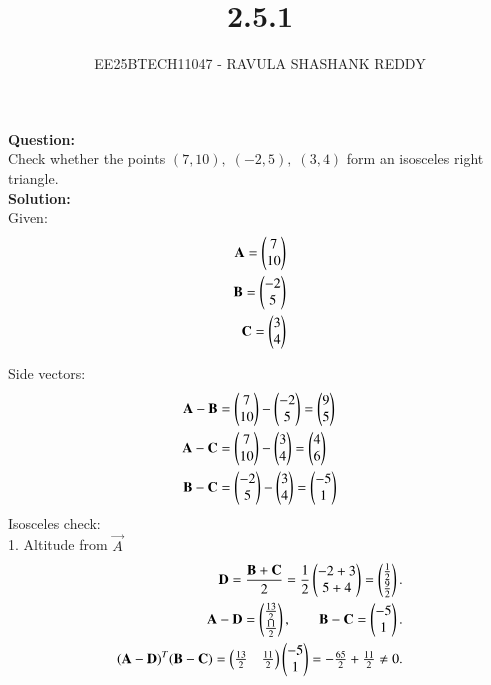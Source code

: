 \documentclass[journal]{article}
\begin{document}
	
	
	\vspace{3cm}
	
\title{2.5.1}
\author{EE25BTECH11047 - RAVULA SHASHANK REDDY}
\maketitle
\hrulefill
\bigskip 

\renewcommand{\thetable}{\theenumi}
\setlength{\intextsep}{10pt}
\textbf{Question:} \\

Check whether the points \( (7,10),\; (-2,5),\; (3,4) \) form an isosceles right triangle.\\

\textbf{Solution:}\\

Given:
\begin{align}
\mathbf{A} = \begin{pmatrix}7 \\ 10\end{pmatrix} \\
\mathbf{B} = \begin{pmatrix}-2 \\ 5\end{pmatrix} \\
\mathbf{C} = \begin{pmatrix}3 \\ 4\end{pmatrix}
\end{align}

Side vectors:
\begin{align}
\mathbf{A}-\mathbf{B} &= \begin{pmatrix}7 \\ 10\end{pmatrix} - \begin{pmatrix}-2 \\ 5\end{pmatrix} = \begin{pmatrix}9 \\ 5\end{pmatrix} \\
\mathbf{A}-\mathbf{C} &= \begin{pmatrix}7 \\ 10\end{pmatrix} - \begin{pmatrix}3 \\ 4\end{pmatrix} = \begin{pmatrix}4 \\ 6\end{pmatrix} \\
\mathbf{B}-\mathbf{C} &= \begin{pmatrix}-2 \\ 5\end{pmatrix} - \begin{pmatrix}3 \\ 4\end{pmatrix} = \begin{pmatrix}-5 \\ 1\end{pmatrix}
\end{align}
\newpage
Isosceles check:\\

1. Altitude from $\vec{A}$ 
\begin{align}
\mathbf{D}=\frac{\mathbf{B}+\mathbf{C}}{2}
=\frac{1}{2}\begin{pmatrix}-2+3\\5+4\end{pmatrix}
=\begin{pmatrix}\tfrac{1}{2}\\\tfrac{9}{2}\end{pmatrix}.\\
\mathbf{A}-\mathbf{D}
=\begin{pmatrix}\tfrac{13}{2}\\\tfrac{11}{2}\end{pmatrix},\qquad
\mathbf{B}-\mathbf{C}
=\begin{pmatrix}-5\\1\end{pmatrix}.\\
(\mathbf{A}-\mathbf{D})^{T}(\mathbf{B}-\mathbf{C})
=\begin{pmatrix}\tfrac{13}{2} & \tfrac{11}{2}\end{pmatrix}
\begin{pmatrix}-5\\1\end{pmatrix}
=-\tfrac{65}{2}+\tfrac{11}{2}\neq 0.
\end{align}
\end{document}

